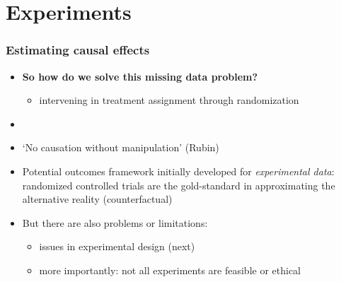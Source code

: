 \documentclass[aspectratio=43]{beamer}
\begin{document}
\section{Experiments}

\begin{frame}
\frametitle{Estimating causal effects}
\centering

\begin{itemize}
  \item \textbf{So how do we solve this missing data problem?}
  \begin{itemize}
    \item intervening in treatment assignment through randomization
  \end{itemize}
  \item[]
  \item<2-> `No causation without manipulation' (Rubin)
  \item<2-> Potential outcomes framework initially developed for \textit{experimental data}: randomized controlled trials are the gold-standard in approximating the alternative reality (counterfactual)
  \item<2-> But there are also problems or limitations:
  \begin{itemize}
    \item issues in experimental design (next)
    \item more importantly: not all experiments are feasible or ethical
  \end{itemize}
\end{itemize}

\end{frame}

%
%
\end{document}

